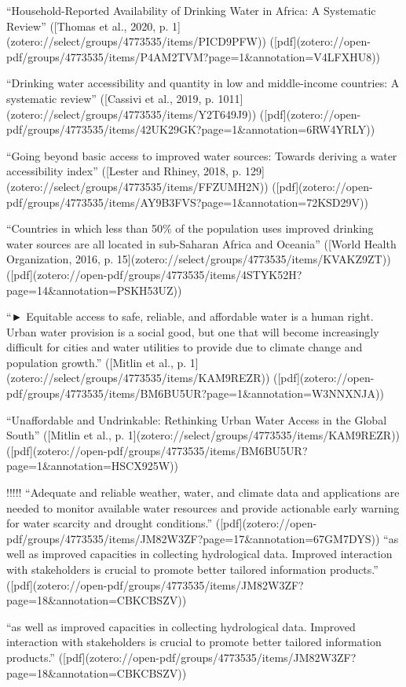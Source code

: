 {“Household-Reported Availability of Drinking Water in Africa: A Systematic Review” ([Thomas et al., 2020, p. 1](zotero://select/groups/4773535/items/PICD9PFW)) ([pdf](zotero://open-pdf/groups/4773535/items/P4AM2TVM?page=1&annotation=V4LFXHU8))

“Drinking water accessibility and quantity in low and middle-income countries: A systematic review” ([Cassivi et al., 2019, p. 1011](zotero://select/groups/4773535/items/Y2T649J9)) ([pdf](zotero://open-pdf/groups/4773535/items/42UK29GK?page=1&annotation=6RW4YRLY))

“Going beyond basic access to improved water sources: Towards deriving a water accessibility index” ([Lester and Rhiney, 2018, p. 129](zotero://select/groups/4773535/items/FFZUMH2N)) ([pdf](zotero://open-pdf/groups/4773535/items/AY9B3FVS?page=1&annotation=72KSD29V))

“Countries in which less than 50\% of the population uses improved drinking water sources are all located in sub-Saharan Africa and Oceania” ([World Health Organization, 2016, p. 15](zotero://select/groups/4773535/items/KVAKZ9ZT)) ([pdf](zotero://open-pdf/groups/4773535/items/4STYK52H?page=14&annotation=PSKH53UZ))

“► Equitable access to safe, reliable, and affordable water is a human right. Urban water provision is a social good, but one that will become increasingly difficult for cities and water utilities to provide due to climate change and population growth.” ([Mitlin et al., p. 1](zotero://select/groups/4773535/items/KAM9REZR)) ([pdf](zotero://open-pdf/groups/4773535/items/BM6BU5UR?page=1&annotation=W3NNXNJA))

“Unaffordable and Undrinkable: Rethinking Urban Water Access in the Global South” ([Mitlin et al., p. 1](zotero://select/groups/4773535/items/KAM9REZR)) ([pdf](zotero://open-pdf/groups/4773535/items/BM6BU5UR?page=1&annotation=HSCX925W))

!!!!!
“Adequate and reliable weather, water, and climate data and applications are needed to monitor available water resources and provide actionable early warning for water scarcity and drought conditions.” ([pdf](zotero://open-pdf/groups/4773535/items/JM82W3ZF?page=17&annotation=67GM7DYS))
“as well as improved capacities in collecting hydrological data. Improved interaction with stakeholders is crucial to promote better tailored information products.” ([pdf](zotero://open-pdf/groups/4773535/items/JM82W3ZF?page=18&annotation=CBKCBSZV))


“as well as improved capacities in collecting hydrological data. Improved interaction with stakeholders is crucial to promote better tailored information products.” ([pdf](zotero://open-pdf/groups/4773535/items/JM82W3ZF?page=18&annotation=CBKCBSZV))

}
